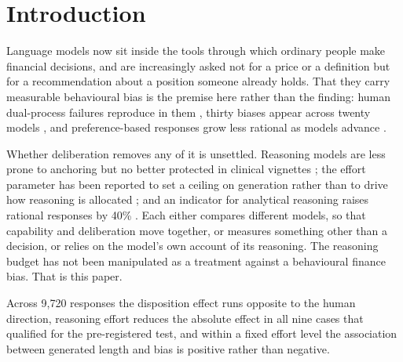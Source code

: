 \section{Introduction}
\label{sec:intro}
Language models now sit inside the tools through which ordinary people make
financial decisions, and are increasingly asked not for a price or a
definition but for a recommendation about a position someone already holds.
That they carry measurable behavioural bias is the premise here rather than
the finding: human dual-process failures reproduce in them
\citep{hagendorff2023intuitive}, thirty biases appear across twenty models
\citep{malberg2025comprehensive}, and preference-based responses grow less
rational as models advance \citep{bini2026behavioral}.

Whether deliberation removes any of it is unsettled. Reasoning models are
less prone to anchoring \citep{takenami2025anchoring} but no better protected
in clinical vignettes \citep{kim2025biasmedqa}; the effort parameter has been
reported to set a ceiling on generation rather than to drive how reasoning is
allocated \citep{hu2026effort}; and an indicator for analytical reasoning
raises rational responses by 40\% \citep{bini2026behavioral}. Each either
compares different models, so that capability and deliberation move together,
or measures something other than a decision, or relies on the model's own
account of its reasoning. The reasoning budget has not been
manipulated as a treatment against a behavioural finance bias. That is this
paper.

Across 9{,}720 responses the disposition effect runs opposite to the human
direction, reasoning effort reduces the absolute effect in all nine cases
that qualified for the pre-registered test, and within a fixed effort level
the association between generated length and bias is positive rather than
negative.

